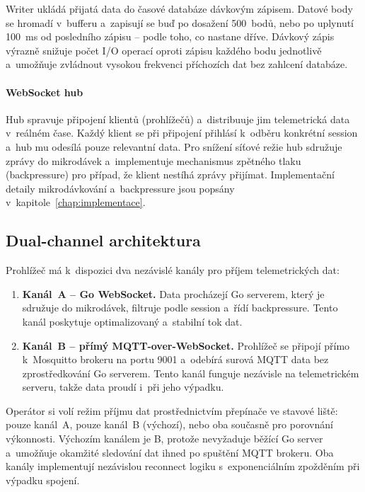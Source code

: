 Writer ukládá přijatá data do časové databáze dávkovým zápisem. Datové body se hromadí v~bufferu a~zapisují se buď po dosažení 500~bodů, nebo po uplynutí 100~ms od posledního zápisu -- podle toho, co nastane dříve. Dávkový zápis výrazně snižuje počet I/O operací oproti zápisu každého bodu jednotlivě a~umožňuje zvládnout vysokou frekvenci příchozích dat bez zahlcení databáze.

\paragraph{WebSocket hub}

Hub spravuje připojení klientů (prohlížečů) a~distribuuje jim telemetrická data v~reálném čase. Každý klient se při připojení přihlásí k~odběru konkrétní session a~hub mu odesílá pouze relevantní data. Pro snížení síťové režie hub sdružuje zprávy do mikrodávek a~implementuje mechanismus zpětného tlaku (backpressure) pro případ, že klient nestíhá zprávy přijímat. Implementační detaily mikrodávkování a~backpressure jsou popsány v~kapitole~\ref{chap:implementace}.

\subsection{Dual-channel architektura}

Prohlížeč má k~dispozici dva nezávislé kanály pro příjem telemetrických dat:

\begin{enumerate}
    \item \textbf{Kanál~A -- Go WebSocket.} Data procházejí Go serverem, který je sdružuje do mikrodávek, filtruje podle session a~řídí backpressure. Tento kanál poskytuje optimalizovaný a~stabilní tok dat.
    \item \textbf{Kanál~B -- přímý MQTT-over-WebSocket.} Prohlížeč se připojí přímo k~Mosquitto brokeru na portu 9001 a~odebírá surová MQTT data bez zprostředkování Go serverem. Tento kanál funguje nezávisle na telemetrickém serveru, takže data proudí i~při jeho výpadku.
\end{enumerate}

Operátor si volí režim příjmu dat prostřednictvím přepínače ve stavové liště: pouze kanál~A, pouze kanál~B (výchozí), nebo oba současně pro porovnání výkonnosti. Výchozím kanálem je B, protože nevyžaduje běžící Go server a~umožňuje okamžité sledování dat ihned po spuštění MQTT brokeru. Oba kanály implementují nezávislou reconnect logiku s~exponenciálním zpožděním při výpadku spojení.

